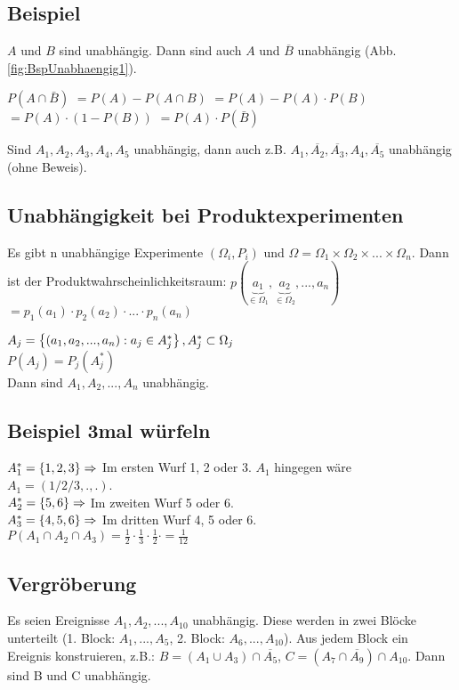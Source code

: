 \renewcommand{\ldate}{2015-11-23}

\subsection{Beispiel}
$A$ und $B$ sind unabhängig. Dann sind auch $A$ und $\overline{B}$ unabhängig (Abb. \ref{fig:BspUnabhaengig1}). 

$P(A\cap \bar B)$
$=P(A) - P(A\cap B)$
$=P(A) - P(A) \cdot P(B)$
$=P(A)\cdot (1-P(B))$
$=P(A)\cdot P(\bar B)$

\begin{satz}
Sind $A_1, A_2, A_3, A_4, A_5$ unabhängig, dann auch z.B. $A_1, \overline{A_2}, \overline{A_3}, A_4, \overline{A_5}$ unabhängig (ohne Beweis).
\end{satz}

\subsection{Unabhängigkeit bei Produktexperimenten}
Es gibt n unabhängige Experimente $(\Omega_i, P_i)$ und $\Omega=\Omega_1 \times \Omega_2 \times ... \times \Omega_n$. Dann ist der Produktwahrscheinlichkeitsraum: 
$p(\underbrace{a_1}_{\in \Omega_1}, \underbrace{a_2}_{\in \Omega_2}, ..., a_n)$
$=p_1(a_1) \cdot p_2(a_2) \cdot ... \cdot p_n(a_n)$

$A_j =  \left\lbrace (a_1,a_2,...,a_n) : a_j \in A_j^* \right\rbrace , A_j^* \subset \Omega_j$\\
$P(A_j) = P_j(A_j^*)$\\
Dann sind $A_1, A_2, ..., A_n$ unabhängig. 

\subsection{Beispiel 3mal würfeln}
$A_1^* =  \left\lbrace 1,2,3 \right\rbrace  \Rightarrow$ Im ersten Wurf 1, 2 oder 3. $A_1$ hingegen wäre $A_1 = (1/2/3, . , . )$.\\
$A_2^* =  \left\lbrace 5,6 \right\rbrace  \Rightarrow$ Im zweiten Wurf 5 oder 6.\\
$A_3^* =  \left\lbrace 4,5,6 \right\rbrace  \Rightarrow$ Im dritten Wurf 4, 5 oder 6.  \\
$P(A_1\cap A_2\cap A_3) = \frac{1}{2} \cdot \frac{1}{3} \cdot \frac{1}{2} \cdot = \frac{1}{12}$ 

\subsection{Vergröberung}
Es seien Ereignisse $A_1, A_2, ..., A_{10}$ unabhängig. Diese werden in zwei Blöcke unterteilt (1. Block: $A_1,...,A_5$, 2. Block: $A_6,...,A_{10}$). Aus jedem Block ein Ereignis konstruieren, z.B.: 
$B=(A_1\cup A_3) \cap \overline{A_5}$, $C=(A_7\cap \overline{A_9}) \cap A_{10}$. Dann sind B und C unabhängig. 


